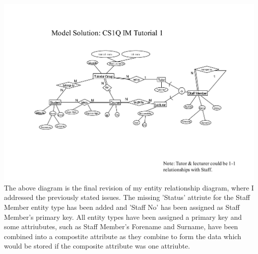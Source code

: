 \documentclass[12pt]{article}
\begin{document}
\includegraphics[width=\linewidth]{tut1_solution}
The above diagram is the final revision of my entity relationship diagram, where I addressed the previously stated issues.
The missing 'Status' attriute for the Staff Member entity type has been added and 'Staff No' has been assigned as Staff Member's primary key.
All entity types have been assigned a primary key and some attriubutes, such as Staff Member's Forename and Surname, have been combined into a compostite attribute as they combine to form the data which would be stored if the composite attribute was one attriubte.
\end{document}
